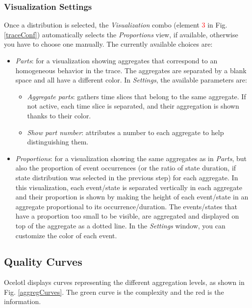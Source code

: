 \documentclass[twoside]{article}
\begin{document}
\begin{sloppypar}
\subsubsection{Visualization Settings}
Once a distribution is selected, the \textit{Visualization} combo (element \textcolor{red}{3} in Fig. \ref{traceConf}) automatically selects the \textit{Proportions} view, if available, otherwise you have to choose one manually. The currently available choices are:
\begin{itemize}
	\item \textit{Parts}: for a visualization showing aggregates that correspond to an homogeneous behavior in the trace. The aggregates are separated by a blank space and all have a different color. In \textit{Settings}, the available parameters are:
	\begin{itemize}
		\item \textit{Aggregate parts}: gathers time slices that belong to the same aggregate. If not active, each time slice is separated, and their aggregation is shown thanks to their color.
		\item \textit{Show part number}: attributes a number to each aggregate to help distinguishing them.
	\end{itemize}
		\item \textit{Proportions}: for a visualization showing the same aggregates as in \textit{Parts}, but also the proportion of event occurrences (or the ratio of state duration, if state distribution was selected in the previous step) for each aggregate. In this visualization, each event/state is separated vertically in each aggregate and their proportion is shown by making the height of each event/state in an aggregate proportional to its occurrence/duration. The events/states that have a proportion too small to be visible, are aggregated and displayed on top of the aggregate as a dotted line. In the \textit{Settings} window, you can customize the color of each event.
\end{itemize}

\subsection{Quality Curves}
Ocelotl displays curves representing the different aggregation levels, as shown in Fig. \ref{aggregCurves}. %
The green curve is the complexity and the red is the information.


\end{sloppypar}
\end{document}

